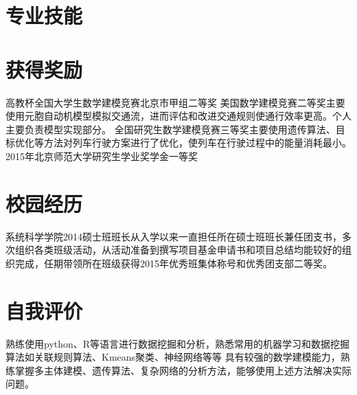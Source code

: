 \documentclass[11pt,a4paper]{moderncv}
\begin{document}
\section{专业技能}

\section{获得奖励} %
{高教杯全国大学生数学建模竞赛北京市甲组二等奖}{}{}{}{}
{美国数学建模竞赛二等奖}{}{}{}{主要使用元胞自动机模型模拟交通流，进而评估和改进交通规则使通行效率更高。个人主要负责模型实现部分。}
{全国研究生数学建模竞赛三等奖}{}{}{}{主要使用遗传算法、目标优化等方法对列车行驶方案进行了优化，使列车在行驶过程中的能量消耗最小。}
{2015年北京师范大学研究生学业奖学金一等奖}{}{}{}{}

\section{校园经历} %
{系统科学学院2014硕士班班长}{}{}{}{从入学以来一直担任所在硕士班班长兼任团支书，多次组织各类班级活动，从活动准备到撰写项目基金申请书和项目总结均能较好的组织完成，任期带领所在班级获得2015年优秀班集体称号和优秀团支部二等奖。}


\section{自我评价} %
\cventry{}
{熟练使用python、R等语言进行数据挖掘和分析，熟悉常用的机器学习和数据挖掘算法如关联规则算法、Kmeans聚类、神经网络等等}
\cventry{}
{具有较强的数学建模能力，熟练掌握多主体建模、遗传算法、复杂网络的分析方法，能够使用上述方法解决实际问题。}
\closesection{}                   %
\renewcommand{\listitemsymbol}{-} %
\end{document}

